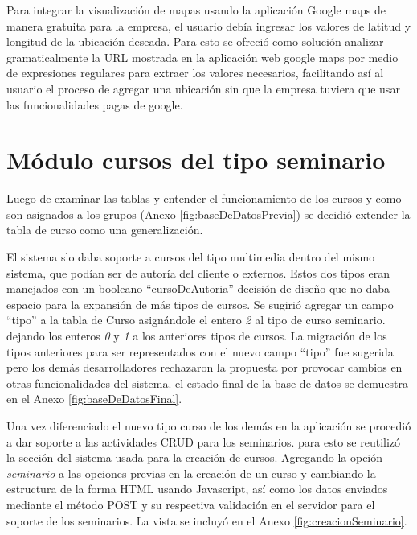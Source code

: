 	Para integrar la visualización de mapas usando la aplicación Google maps de manera gratuita para la empresa, el usuario debía ingresar los valores de latitud y longitud de la ubicación deseada. Para esto se ofreció como solución analizar gramaticalmente la \gls{URL} mostrada en la aplicación web google maps por medio de expresiones regulares para extraer los valores necesarios, facilitando así al usuario el proceso de agregar una ubicación sin que la empresa tuviera que usar las funcionalidades pagas de google.


	\section{Módulo cursos del tipo seminario} %
	\label{sec:cursos_del_tipo_seminario}
	
	Luego de examinar las tablas y entender el funcionamiento de los cursos y como son asignados a los grupos (Anexo \ref{fig:baseDeDatosPrevia}) se decidió extender la tabla de curso como una generalización.

	El sistema slo daba soporte a cursos del tipo multimedia dentro del mismo sistema, que podían ser de autoría del cliente o externos. Estos dos tipos eran manejados con un booleano ``cursoDeAutoria'' decisión de diseño que no daba espacio para la expansión de más tipos de cursos. Se sugirió agregar un campo ``tipo'' a la tabla de Curso asignándole el entero \emph{2} al tipo de curso seminario. dejando los enteros \emph{0} y \emph{1} a los anteriores tipos de cursos. La migración de los tipos anteriores para ser representados con el nuevo campo ``tipo'' fue sugerida pero los demás desarrolladores rechazaron la propuesta por provocar cambios en otras funcionalidades del sistema. el estado final de la base de datos se demuestra en el Anexo \ref{fig:baseDeDatosFinal}.

	Una vez diferenciado el nuevo tipo curso de los demás en la aplicación se procedió a dar soporte a las actividades \gls{CRUD} para los seminarios. para esto se reutilizó la sección del sistema usada para la creación de cursos. Agregando la opción \emph{seminario} a las opciones previas en la creación de un curso y cambiando la estructura de la forma \gls{HTML} usando Javascript, así como los datos enviados mediante el método POST y su respectiva validación en el servidor para el soporte de los seminarios. La vista se incluyó en el Anexo \ref{fig:creacionSeminario}.

